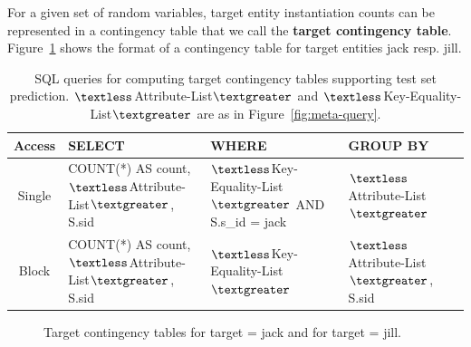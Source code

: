 \documentclass{IEEEtran}
\begin{document}
For a given set of random variables, target entity instantiation counts can be represented in a contingency table that we call the \textbf{target contingency table}. Figure~\ref{fig:targetct} shows the format of a contingency table for target entities jack resp. jill.

\begin{table}[t]
\caption{SQL queries for computing target contingency tables supporting test set prediction.  $\textless$Attribute-List$\textgreater$ and  $\textless$Key-Equality-List$\textgreater$ are as in Figure~\ref{fig:meta-query}.}
\begin{center}
\begin{tabular}{|c|p{6cm}|p{5cm}|p{4cm}}
Access &SELECT&WHERE&GROUP BY\\\hline
Single &COUNT(*) AS count, $\textless$Attribute-List$\textgreater$, S.sid& $\textless$Key-Equality-List$\textgreater$ AND S.s\_id = jack&  $\textless$Attribute-List$\textgreater$\\
\hline
Block & COUNT(*) AS count,  $\textless$Attribute-List$\textgreater$, S.sid& $\textless$Key-Equality-List$\textgreater$ &  $\textless$Attribute-List$\textgreater$, S.sid\\
\end{tabular}
\end{center}
\label{table:target-query}
\end{table}%

\begin{figure}[htbp] %
 \centering
{} 
\caption{Target contingency tables for target = jack and for target = jill.}
 \label{fig:targetct}
\end{figure}
\end{document}
